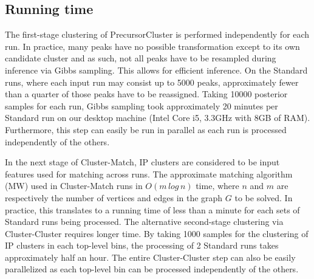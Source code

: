 

\subsection{Running time}

The first-stage clustering of PrecursorCluster is performed independently for each run. In practice, many peaks have no possible transformation except to its own candidate cluster and as such, not all peaks have to be resampled during inference via Gibbs sampling. This allows for efficient inference. On the Standard runs, where each input run may consist up to 5000 peaks, approximately fewer than a quarter of those peaks have to be reassigned. Taking 10000 posterior samples for each run, Gibbs sampling took approximately 20 minutes per Standard run on our desktop machine (Intel Core i5, 3.3GHz with 8GB of RAM). Furthermore, this step can easily be run in parallel as each run is processed independently of the others.

In the next stage of Cluster-Match, IP clusters are considered to be input features used for matching across runs. The approximate matching algorithm (MW) used in Cluster-Match runs in $O(m\, log\, n)$ time, where $n$ and $m$ are respectively the number of vertices and edges in the graph $G$ to be solved. In practice, this translates to a running time of less than a minute for each sets of Standard runs being processed. The alternative second-stage clustering via Cluster-Cluster requires longer time. By taking 1000 samples for the clustering of IP clusters in each top-level bins, the processing of 2 Standard runs takes approximately half an hour. The entire Cluster-Cluster step can also be easily parallelized as each top-level bin can be processed independently of the others.

